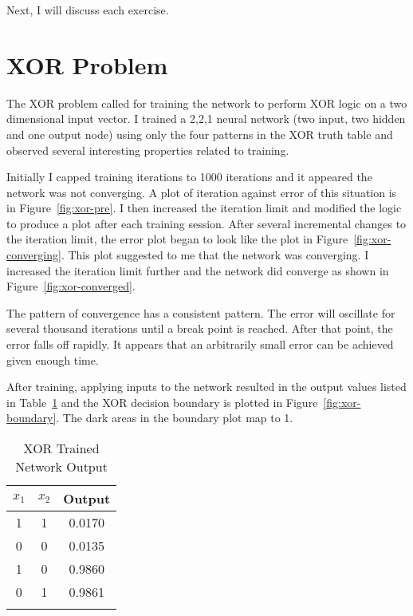 \documentclass{article}
\begin{document}
Next, I will discuss each exercise.

\section*{XOR Problem}
The XOR problem called for training the network to perform XOR logic
on a two dimensional input vector.  I trained a 2,2,1 neural network
(two input, two hidden and one output node) using only the four
patterns in the XOR truth table and observed several interesting
properties related to training.

Initially I capped training iterations to 1000 iterations and it
appeared the network was not converging.  A plot of iteration against
error of this situation is in Figure~\ref{fig:xor-pre}.  I then
increased the iteration limit and modified the logic to produce a plot
after each training session.  After several incremental changes to the
iteration limit, the error plot began to look like the plot in
Figure~\ref{fig:xor-converging}.  This plot suggested to me that the
network was converging.  I increased the iteration limit further and
the network did converge as shown in Figure~\ref{fig:xor-converged}.

The pattern of convergence has a consistent pattern.  The error will
oscillate for several thousand iterations until a break point is
reached. After that point, the error falls off rapidly. It appears
that an arbitrarily small error can be achieved given enough time.

After training, applying inputs to the network resulted in the output
values listed in Table~\ref{table:xor-out} and the XOR decision
boundary is plotted in Figure~\ref{fig:xor-boundary}.  The dark areas
in the boundary plot map to 1.

\begin{table}
  \begin{center}
    \caption{XOR Trained Network Output}
    \begin{tabular}[c]{ c  c | c }
      $ x_1$  & $x_2$ & Output \\
      \hline
      1 & 1 & 0.0170 \\
      0 & 0 & 0.0135 \\
      1 & 0 & 0.9860 \\
      0 & 1 & 0.9861 \\
      \label{table:xor-out}
    \end{tabular}
  \end{center}
\end{table}
\end{document}
